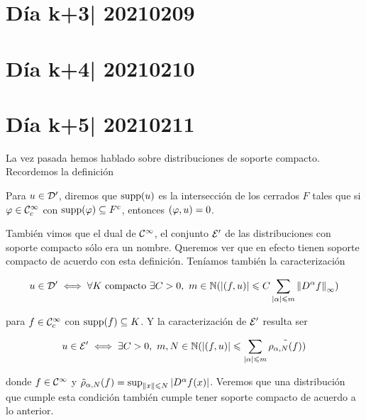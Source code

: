 \documentclass[12pt]{memoir}
\begin{document}
\section{Día k+3| 20210209}
\section{Día k+4| 20210210}
\section{Día k+5| 20210211}

La vez pasada hemos hablado sobre distribuciones de soporte compacto. Recordemos la definición 

\begin{Def}
  Para $u\in\mathcal{D}'$, diremos que $\operatorname{supp}(u)$ es la intersección de los cerrados $F$ tales que si $\varphi\in\mathcal{C}^\infty_c$ con $\operatorname{supp}(\varphi)\subseteq F^c$, entonces $(\varphi,u)=0$. %
\end{Def}

También vimos que el dual de $\mathcal{C}^\infty$, el conjunto $\mathcal{E}'$ de las distribuciones con soporte compacto sólo era un nombre. Queremos ver que en efecto tienen soporte compacto de acuerdo con esta definición. Teníamos también la caracterización

$$u\in\cD'\iff \forall K\ \text{compacto}\ \exists C>0,\ m\in\bN(|(f,u)|\leq C\sum_{|\al|\leq m}\nm{D^\al f}_\infty)$$

para $f\in\mathcal{C}^\infty_c$ con $\operatorname{supp}(f)\subseteq K$. Y la caracterización de $\mathcal{E}'$ resulta ser 

$$u\in\cE'\iff \exists C>0,\ m,N\in\bN(|(f,u)|\leq \sum_{|\al|\leq m}\tilde{\rho_{\al,N}(f)})$$

donde $f\in\mathcal{C}^\infty$ y $\tilde{\rho}_{\alpha,N}(f)=\sup_{\left\|x\right\|\leqslant N}|D^\alpha f(x)|$. Veremos que una distribución que cumple esta condición también cumple tener soporte compacto de acuerdo a lo anterior.
\end{document}
